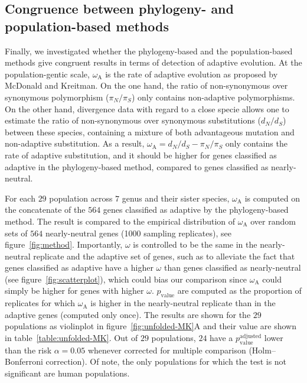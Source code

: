 \documentclass{article}
\newcommand{\dn}{d_N}
\newcommand{\ds}{d_S}
\newcommand{\dnds}{\dn / \ds}
\newcommand{\pn}{\pi_N}
\newcommand{\ps}{\pi_S}
\newcommand{\pnps}{\pn / \ps}
\begin{document}
\subsection*{Congruence between phylogeny- and population-based methods}
Finally, we investigated whether the phylogeny-based and the population-based methods give congruent results in terms of detection of adaptive evolution.
At the population-gentic scale, $\omega_{\mathrm{A}}$ is the rate of adaptive evolution as proposed by McDonald and Kreitman\cite{mcdonald_adaptative_1991}.
On the one hand, the ratio of non-synonymous over synonymous polymorphism ($\pnps$) only contains non-adaptive polymorphisms.
On the other hand, divergence data with regard to a close specie allows one to estimate the ratio of non-synonymous over synonymous substitutions ($\dnds$) between these species, containing a mixture of both advantageous mutation and non-adaptive substitution.
As a result, $\omega_{\mathrm{A}} = \dnds - \pnps$ only contains the rate of adaptive substitution, and it should be higher for genes classified as adaptive in the phylogeny-based method, compared to genes classified as nearly-neutral.

For each $29$ population across $7$ genus and their sister species, $\omega_{\mathrm{A}}$ is computed on the concatenate of the $564$ genes classified as adaptive by the phylogeny-based method.
The result is compared to the empirical distribution of $\omega_{\mathrm{A}}$ over random sets of $564$ nearly-neutral genes (1000 sampling replicates), see figure~\ref{fig:method}.
Importantly, $\omega$ is controlled to be the same in the nearly-neutral replicate and the adaptive set of genes, such as to alleviate the fact that genes classified as adaptive have a higher $\omega$ than genes classified as nearly-neutral (see figure~\ref{fig:scatterplot}), which could bias our comparison since $\omega_{\mathrm{A}}$ could simply be higher for genes with higher $\omega$.
$p_{\mathrm{value}}$ are computed as the proportion of replicates for which $\omega_{\mathrm{A}}$ is higher in the nearly-neutral replicate than in the adaptive genes (computed only once).
The results are shown for the $29$ populations as violinplot in figure~\ref{fig:unfolded-MK}A and their value are shown in table~\ref{table:unfolded-MK}.
Out of $29$ populations, $24$ have a $p_{\mathrm{value}}^{\mathrm{adjusted}}$ lower than the risk $\alpha=0.05$ whenever corrected for multiple comparison (Holm–Bonferroni correction).
Of note, the only populations for which the test is not significant are human populations.
\end{document}
